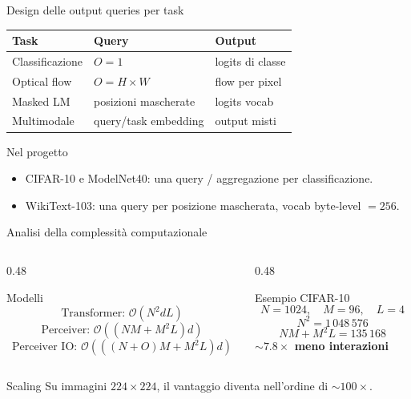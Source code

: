 \documentclass[aspectratio=169,10pt]{beamer}
\newcommand{\bigO}{\mathcal{O}}
\begin{document}
\begin{frame}{Design delle output queries per task}
\small
\begin{center}
\begin{tabular}{lll}
\toprule
\textbf{Task} & \textbf{Query} & \textbf{Output} \\
\midrule
Classificazione & $O=1$ & logits di classe \\
Optical flow & $O=H \times W$ & flow per pixel \\
Masked LM & posizioni mascherate & logits vocab \\
Multimodale & query/task embedding & output misti \\
\bottomrule
\end{tabular}
\end{center}

\vspace{0.5em}
\begin{exampleblock}{Nel progetto}
\begin{itemize}
  \item CIFAR-10 e ModelNet40: una query / aggregazione per classificazione.
  \item WikiText-103: una query per posizione mascherata, vocab byte-level $=256$.
\end{itemize}
\end{exampleblock}
\end{frame}

\begin{frame}{Analisi della complessità computazionale}
\small
\begin{columns}[T]
\begin{column}{0.48\textwidth}
\begin{block}{Modelli}
\[
\text{Transformer: } \bigO(N^2 d L)
\]
\[
\text{Perceiver: } \bigO((NM + M^2L)d)
\]
\[
\text{Perceiver IO: } \bigO(((N+O)M + M^2L)d)
\]
\end{block}
\end{column}
\begin{column}{0.48\textwidth}
\begin{exampleblock}{Esempio CIFAR-10}
\[
N=1024,\quad M=96,\quad L=4
\]
\[
N^2 = 1\,048\,576
\]
\[
NM+M^2L = 135\,168
\]
\textbf{$\sim7.8\times$ meno interazioni}
\end{exampleblock}
\end{column}
\end{columns}

\begin{alertblock}{Scaling}
Su immagini $224 \times 224$, il vantaggio diventa nell'ordine di $\sim100\times$.
\end{alertblock}
\end{frame}
\end{document}
